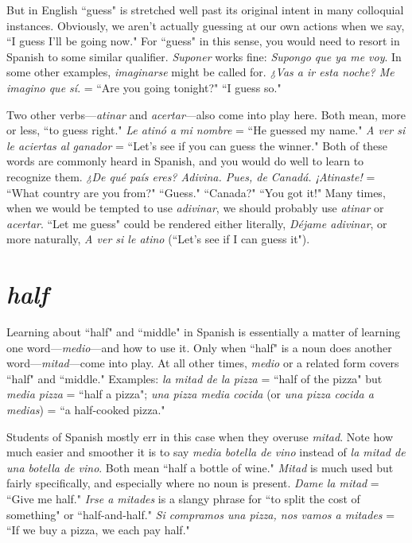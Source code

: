 But in English ``guess" is stretched well past its original intent
in many colloquial instances. Obviously, we aren't actually guessing at
our own actions when we say, ``I guess I'll be going now." For ``guess"
in this sense, you would need to resort in Spanish to some similar
qualifier. \emph{Suponer} works fine: \emph{Supongo que ya me voy}. In some other
examples, \emph{imaginarse} might be called for. \emph{¿Vas a ir esta noche? Me
	imagino que sí}. = ``Are you going tonight?" ``I guess so."

Two other verbs---\emph{atinar} and \emph{acertar}---also come into play
here. Both mean, more or less, ``to guess right." \emph{Le atinó a mi nombre}
= ``He guessed my name." \emph{A ver si le aciertas al ganador} = ``Let's see
if you can guess the winner." Both of these words are commonly heard
in Spanish, and you would do well to learn to recognize them. \emph{¿De qué
	país eres? Adivina. Pues, de Canadá. ¡Atinaste!} = ``What country are
you from?" ``Guess." ``Canada?" ``You got it!" Many times, when we
would be tempted to use \emph{adivinar}, we should probably use \emph{atinar} or
\emph{acertar}. ``Let me guess" could be rendered either literally, \emph{Déjame adivinar}, or more naturally, \emph{A ver si le atino} (``Let's see if I can guess it").

\section{\emph{half}}

Learning about ``half" and ``middle" in Spanish is essentially a
matter of learning one word---\emph{medio}---and how to use it. Only when
``half" is a noun does another word---\emph{mitad}---come into play. At all
other times, \emph{medio} or a related form covers ``half" and ``middle." Examples: \emph{la mitad de la pizza} = ``half of the pizza" but \emph{media pizza} =
``half a pizza"; \emph{una pizza media cocida} (or \emph{una pizza cocida a medias})
= ``a half-cooked pizza."

Students of Spanish mostly err in this case when they overuse
\emph{mitad}. Note how much easier and smoother it is to say \emph{media botella
	de vino} instead of \emph{la mitad de una botella de vino}. Both mean ``half a
bottle of wine." \emph{Mitad} is much used but fairly specifically, and especially where no noun is present. \emph{Dame la mitad} = ``Give me half."
\emph{Irse a mitades} is a slangy phrase for ``to split the cost of something" or
``half-and-half." \emph{Si compramos una pizza, nos vamos a mitades} = ``If
we buy a pizza, we each pay half."

